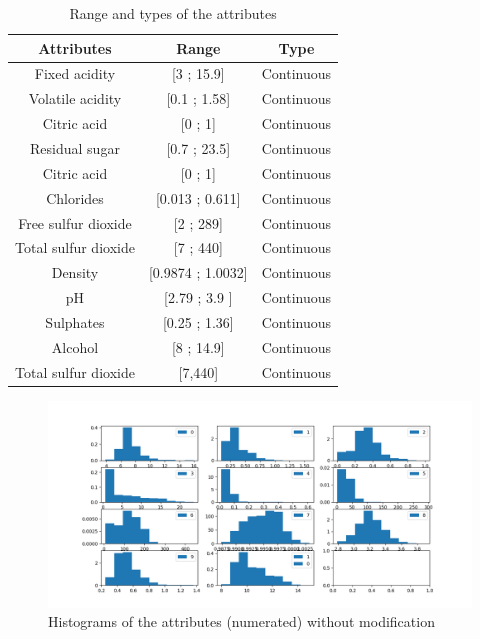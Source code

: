 \documentclass[twoside,a4paper,12pt]{report}
\begin{document}
\begin{table}
\centering
 \begin{tabular}{||c c c||} 
 \hline \hline
 Attributes & Range & Type\\ 
 \hline\hline
 Fixed acidity & [3 ; 15.9] & Continuous\\ 
 \hline
 Volatile acidity & [0.1 ; 1.58] & Continuous\\
 \hline
 Citric acid & [0 ; 1] & Continuous \\
  \hline
 Residual sugar & [0.7 ; 23.5] & Continuous \\
  \hline
 Citric acid & [0 ; 1] & Continuous \\
 \hline
 Chlorides & [0.013 ; 0.611] & Continuous \\
 \hline
 Free sulfur dioxide & [2 ; 289] & Continuous \\
 \hline
 Total sulfur dioxide & [7 ; 440] & Continuous \\
  \hline
 Density & [0.9874 ; 1.0032] & Continuous \\
  \hline
  pH & [2.79 ; 3.9 ] & Continuous \\
   \hline
 Sulphates & [0.25 ; 1.36] & Continuous \\
  \hline
 Alcohol & [8 ; 14.9] & Continuous \\
  \hline
 Total sulfur dioxide & [7,440] & Continuous \\
 \hline \hline
\end{tabular}
\caption{Range and types of the attributes \label{RangeAndTypesAttributes}
}
\end{table}


\begin{figure}
    \centering
    \includegraphics[width=1\textwidth,height=0.7\textheight]{histograms.png}
    \caption{Histograms of the attributes (numerated) without modification}
     \label{HistogramsWithoutMod} 
\end{figure}
\end{document}
